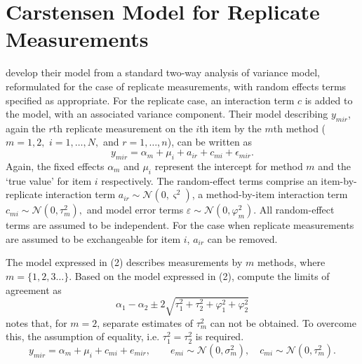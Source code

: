 \documentclass[12pt, a4paper]{report}
\theoremstyle{plain}
\theoremstyle{definition}
\theoremstyle{remark}
\begin{document}


\section{Carstensen Model for Replicate Measurements}


\citet{BXC2008} develop their model from a standard two-way analysis of variance model, reformulated for the case of replicate measurements, with random effects terms specified as appropriate. 
For the replicate case, an interaction term $c$ is added to the model, with an associated variance component. Their model describing $y_{mir} $, again the $r$th replicate measurement on the $i$th item by the $m$th method ($m=1,2,$ $i=1,\ldots,N,$ and $r = 1,\ldots,n$), can be written as
\begin{equation}\label{BXC-model}
y_{mir}  = \alpha_{m} + \mu_{i} + a_{ir} + c_{mi} + \epsilon_{mir}.
\end{equation}
Again, the fixed effects $\alpha_{m}$ and $\mu_{i}$  represent the intercept for method $m$ and the `true value' for item $i$ respectively. The random-effect terms comprise an item-by-replicate interaction term $a_{ir} \sim \mathcal{N}(0,\varsigma^{2})$, a method-by-item interaction term $c_{mi} \sim \mathcal{N}(0,\tau^{2}_{m}),$ and model error terms $\varepsilon \sim \mathcal{N}(0,\varphi^{2}_{m}).$ All random-effect terms are assumed to be independent. For the case when replicate measurements are assumed to be exchangeable for item $i$, $a_{ir}$ can be removed.

The model expressed in (2) describes measurements by $m$ methods, where $m = \{1,2,3\ldots\}$. Based on the model expressed in (2), \citet{BXC2008} compute the limits of agreement as
\[
\alpha_1 - \alpha_2 \pm 2 \sqrt{ \tau^2_1 +  \tau^2_2 +  \varphi^2_1 +  \varphi^2_2 }
\]
\citet{BXC2008} notes that, for $m=2$, separate estimates of $\tau^2_m$ can not be obtained. To overcome this, the assumption of equality, i.e. $\tau^2_1 = \tau^2_2$ is required.
\begin{equation}
y_{mir}  = \alpha_{m} + \mu_{i} + c_{mi} + e_{mir}, \qquad  e_{mi}
\sim \mathcal{N}(0,\sigma^{2}_{m}), \quad c_{mi} \sim \mathcal{N}(0,\tau^{2}_{m}).
\end{equation}

\end{document}
